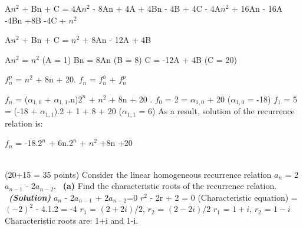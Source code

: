 \documentclass[a4 paper]{article}
\numberwithin{equation}{section}
\newcommand{\problem}[2]{~\\\fbox{\textbf{Problem #1}}\hfill (#2 points)\newline\newline}
\newcommand{\subproblem}[1]{~\newline\textbf{(#1)}}
\newcommand{\solution}{~\newline\textbf{\textit{(Solution)}} }
\newcommand{\0}{\mathbf{0}}
\begin{document}
A$n^2$ + Bn + C = 4A$n^2$ - 8An + 4A + 4Bn - 4B + 4C - 4A$n^2$ + 16An - 16A -4Bn +8B -4C + $n^2$\newline

A$n^2$ + Bn + C = $n^2$ + 8An - 12A + 4B\newline

A$n^2$ = $n^2$ (A = 1) \quad Bn = 8An (B = 8) \quad C = -12A + 4B (C = 20)\newline

$f_n^p$ = $n^2$ + 8n + 20\newline{}. $f_n$ = $f_n^h$ + $f_n^p$\newline

$f_n$ = ($\alpha_{1,0}$ + $\alpha_{1,1}$.n)$2^n$ + $n^2$ + 8n + 20
\newline {}. $f_0$ = 2 = $\alpha_{1,0}$ + 20 ($\alpha_{1,0}$ = -18)\newline \newline
$f_1$ = 5 = (-18 + $\alpha_{1,1}$).2 + 1 + 8 + 20 ($\alpha_{1,1}$ = 6)\newline\newline
As a result, solution of the recurrence relation is:\newline

$f_n$ = -18.$2^n$ + 6n.$2^n$ + $n^2$ +8n +20 \newline





\problem{3}{20+15 = 35}
Consider the linear homogeneous recurrence relation $a_n$ = 2$a_{n-1}$ - 2$a_{n-2}$.
\subproblem{a} Find the characteristic roots of the recurrence relation.
\solution
\newline
\newline
$a_n$ - 2$a_{n-1}$ + 2$a_{n-2}$=0 \newline \newline
$r^2$ - 2r + 2 = 0 (Characteristic equation)\newline
\Delta = $(-2)^2$ - 4.1.2\newline
\Delta = -4
\newline \newline
$r_1$ = $(2 + 2i)/2$, $r_2$ = $(2 - 2i)/2$\newline
$r_1$ = $1 + i$, $r_2$ = $1 - i$\newline
Characteristic roots are: 1+i and 1-i. \newline
\end{document}
